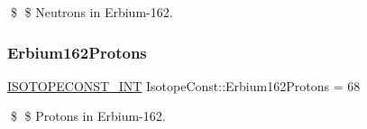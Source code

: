 \$ \$ Neutrons in Erbium-\/162. \mbox{\label{group___isotope_const-_erbium-_er162_gae60d02d02ead44da46144072f9610975}} 
\subsubsection{\texorpdfstring{Erbium162\+Protons}{Erbium162Protons}}
{\footnotesize\ttfamily \mbox{\hyperlink{group___isotope_const-_macros_ga5f18360b3e99483a35c32d789e62621c}{I\+S\+O\+T\+O\+P\+E\+C\+O\+N\+S\+T\+\_\+\+I\+NT}} Isotope\+Const\+::\+Erbium162\+Protons = 68}

\$ \$ Protons in Erbium-\/162. 